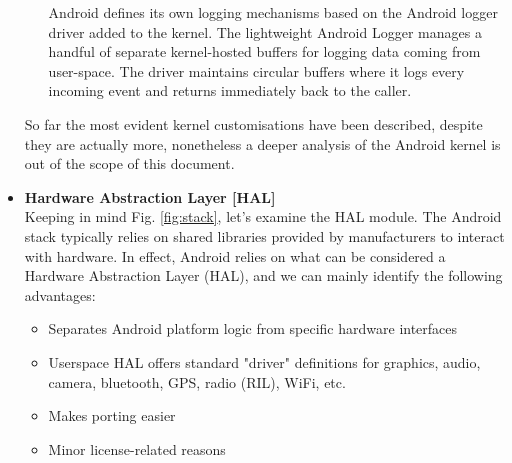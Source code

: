 \begin{itemize}
\begin{itemize}
	Android defines its own logging mechanisms based on the Android logger driver added to the kernel. The lightweight Android Logger manages a handful of separate kernel-hosted buffers for logging data coming from user-space. The driver maintains circular buffers where it logs every incoming event and returns immediately back to the caller.
	\end{itemize}
So far the most evident kernel customisations have been described, despite they are actually more, nonetheless a deeper analysis of the Android kernel is out of the scope of this document.
\item \textbf{Hardware Abstraction Layer [HAL]}\\
Keeping in mind Fig. \ref{fig:stack}, let's examine the HAL module. The Android stack typically relies on shared libraries provided by manufacturers to interact with hardware. In effect, Android relies on what can be considered a Hardware Abstraction Layer (HAL), and we can mainly identify the following advantages:
	\begin{itemize}
		\item Separates Android platform logic from specific hardware interfaces
		\item User­space HAL offers standard "driver" definitions for graphics, audio, camera, bluetooth, GPS, radio (RIL), WiFi, etc.
		\item Makes porting easier
		\item Minor license-related reasons
	\end{itemize}
\begin{figure}[!htb]
	\centering

\end{figure}
\end{itemize}
